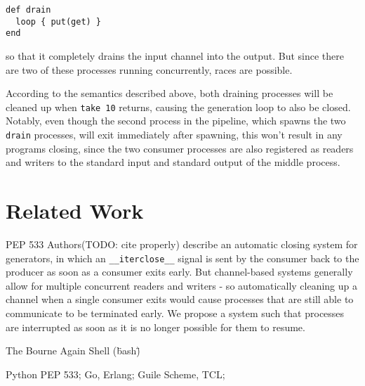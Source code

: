 \documentclass[sigplan,10pt,nosumlimits]{acmart}
\begin{document}
\begin{verbatim}
def drain
  loop { put(get) }
end
\end{verbatim}
so that it completely drains the input channel into the output.
But since there are two of these processes running concurrently, races are possible.

According to the semantics described above, both draining processes will be cleaned up when \verb/take 10/ returns, causing the generation loop to also be closed.
Notably, even though the second process in the pipeline, which spawns the two \verb/drain/ processes, will exit immediately after spawning, this won't result in any programs closing, since the two consumer processes are also registered as readers and writers to the standard input and standard output of the middle process.




\section{Related Work}

PEP 533 Authors(TODO: cite properly) describe an automatic closing system for generators, in which an \verb/__iterclose__/ signal is sent by the consumer back to the producer as soon as a consumer exits early.
But channel-based systems generally allow for multiple concurrent readers and writers - so automatically cleaning up a channel when a single consumer exits would cause processes that are still able to communicate to be terminated early.
We propose a system such that processes are interrupted as soon as it is no longer possible for them to resume.

The Bourne Again Shell (\"bash\") 

Python PEP 533; Go, Erlang; Guile Scheme, TCL;
\end{document}
